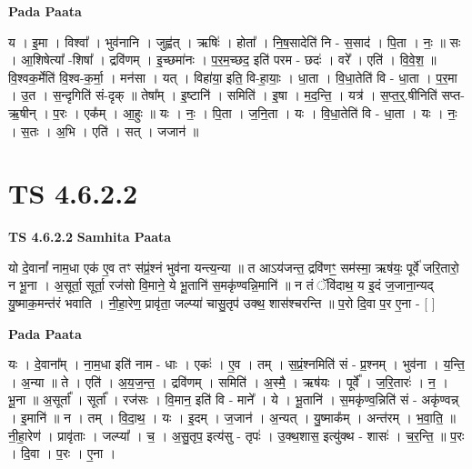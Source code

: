 \documentclass[17pt]{extarticle}
\begin{document}
\textbf{Pada Paata} \newline

य । इ॒मा । विश्वा᳚ । भुव॑नानि । जुह्व॑त् । ऋषिः॑ । होता᳚ । नि॒ष॒सादेति॑ नि - स॒साद॑ । पि॒ता । नः॒ ॥ सः । आ॒शिषेत्या᳚ -शिषा᳚ । द्रवि॑णम् । इ॒च्छमा॑नः । प॒र॒म॒च्छद॒ इति॑ परम - छदः॑ । वरे᳚ । एति॑ । वि॒वे॒श॒ ॥ वि॒श्वक॒र्मेति॑ वि॒श्व-क॒र्मा॒ । मन॑सा । यत् । विहा॑या॒ इति॒ वि-हा॒याः॒ । धा॒ता । वि॒धा॒तेति॑ वि - धा॒ता । प॒र॒मा । उ॒त । स॒न्दृगिति॑ सं-दृक् ॥ तेषा᳚म् । इ॒ष्टानि॑ । समिति॑ । इ॒षा । म॒द॒न्ति॒ । यत्र॑ । स॒प्त॒र्॒.षीनिति॑ सप्त-ऋ॒षीन् । प॒रः । एक᳚म् । आ॒हुः ॥ यः । नः॒ । पि॒ता । ज॒नि॒ता । यः । वि॒धा॒तेति॑ वि - धा॒ता । यः । नः॒ । स॒तः । अ॒भि । एति॑ । सत् । जजान॑ ॥  \newline




\section*{ TS 4.6.2.2 }

\textbf{TS 4.6.2.2 } \newline
\textbf{Samhita Paata} \newline

यो दे॒वानां᳚ नाम॒धा एक॑ ए॒व तꣳ स॑प्रं॒श्नं भुव॑ना यन्त्य॒न्या ॥ त आऽय॑जन्त॒ द्रवि॑णꣳ॒॒ सम॑स्मा॒ ऋष॑यः॒ पूर्वे॑ जरि॒तारो॒ न भू॒ना । अ॒सूर्ता॒ सूर्ता॒ रज॑सो वि॒माने॒ ये भू॒तानि॑ स॒मकृ॑ण्वन्नि॒मानि॑ ॥ न तं ॅवि॑दाथ॒ य इ॒दं ज॒जाना॒न्यद् यु॒ष्माक॒मन्त॑रं भवाति । नी॒हा॒रेण॒ प्रावृ॑ता॒ जल्प्या॑ चासु॒तृप॑ उक्थ॒ शास॑श्चरन्ति ॥ प॒रो दि॒वा प॒र ए॒ना - [  ] \newline

\textbf{Pada Paata} \newline

यः । दे॒वाना᳚म् । ना॒म॒धा इति॑ नाम - धाः । एकः॑ । ए॒व । तम् । स॒प्रं॒श्नमिति॑ सं - प्र॒श्नम् । भुव॑ना । य॒न्ति॒ । अ॒न्या ॥ ते । एति॑ । अ॒य॒ज॒न्त॒ । द्रवि॑णम् । समिति॑ । अ॒स्मै॒ । ऋष॑यः । पूर्वे᳚ । ज॒रि॒तारः॑ । न॒ । भू॒ना ॥ अ॒सूर्ता᳚ । सूर्ता᳚ । रज॑सः । वि॒मान॒ इति॑ वि - माने᳚ । ये । भू॒तानि॑ । स॒मकृ॑ण्व॒न्निति॑ सं - अकृ॑ण्वन्न् । इ॒मानि॑ ॥ न । तम् । वि॒दा॒थ॒ । यः । इ॒दम् । ज॒जान॑ । अ॒न्यत् । यु॒ष्माक᳚म् । अन्त॑रम् । भ॒वा॒ति॒ ॥ नी॒हा॒रेण॑ । प्रावृ॑ताः । जल्प्या᳚ । च॒ । अ॒सु॒तृप॒ इत्य॑सु - तृपः॑ । उ॒क्थ॒शास॒ इत्यु॑क्थ - शासः॑ । च॒र॒न्ति॒ ॥ प॒रः । दि॒वा । प॒रः । ए॒ना ।  \newline




\end{document}
